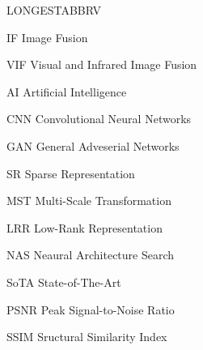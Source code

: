 \begin{theglossary}{LONGESTABBRV}

\item[IF] Image Fusion
\item[VIF] Visual and Infrared Image Fusion 
\item[AI] Artificial Intelligence
\item[CNN] Convolutional Neural Networks
\item[GAN] General Adveserial Networks   
\item[SR] Sparse Representation
\item[MST] Multi-Scale Transformation
\item[LRR] Low-Rank Representation
\item[NAS] Neaural Architecture Search
\item[SoTA] State-of-The-Art
\item[PSNR] Peak Signal-to-Noise Ratio
\item[SSIM] Sructural Similarity Index
\end{theglossary}
